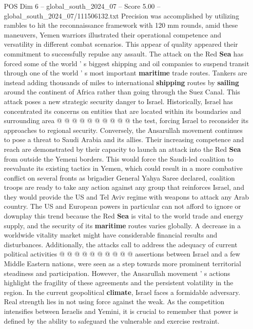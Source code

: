 \begin{textsample}{POS Dim 6 – global\_south\_2024\_07 – Score 5.00 – global\_south\_2024\_07/111506132.txt}
Precision was accomplished by utilizing rambles to hit the reconnaissance framework with 120 mm rounds, amid these maneuvers, Yemen warriors illustrated their operational competence and versatility in different combat scenarios.
This appear of quality appeared their commitment to successfully repulse any assault.
The attack on the Red \textbf{Sea} has forced some of the world ' s biggest shipping and oil companies to suspend transit through one of the world ' s most important \textbf{maritime} trade routes.
Tankers are instead adding thousands of miles to international \textbf{shipping} routes by \textbf{sailing} around the continent of Africa rather than going through the Suez Canal.
This attack poses a new strategic security danger to Israel.
Historically, Israel has concentrated its concerns on entities that are located within its boundaries and surrounding area @ @ @ @ @ @ @ @ @ @ the test, forcing Israel to reconsider its approaches to regional security.
Conversely, the Ansarullah movement continues to pose a threat to Saudi Arabia and its allies.
Their increasing competence and reach are demonstrated by their capacity to launch an attack into the Red \textbf{Sea} from outside the Yemeni borders.
This would force the Saudi-led coalition to reevaluate its existing tactics in Yemen, which could result in a more combative conflict on several fronts as brigadier General Yahya Saree declared, coalition troops are ready to take any action against any group that reinforces Israel, and they would provide the US and Tel Aviv regime with weapons to attack any Arab country.
The US and European powers in particular can not afford to ignore or downplay this trend because the Red \textbf{Sea} is vital to the world trade and energy supply, and the security of its \textbf{maritime} routes varies globally.
A decrease in a worldwide vitality market might have considerable financial results and disturbances.
Additionally, the attacks call to address the adequacy of current political activities @ @ @ @ @ @ @ @ @ @ assertions between Israel and a few Middle Eastern nations, were seen as a step towards more prominent territorial steadiness and participation.
However, the Ansarullah movement ' s actions highlight the fragility of these agreements and the persistent volatility in the region.
In the current geopolitical \textbf{climate}, Israel faces a formidable adversary.
Real strength lies in not using force against the weak.
As the competition intensifies between Israelis and Yemini, it is crucial to remember that power is defined by the ability to safeguard the vulnerable and exercise restraint.

\end{textsample}
